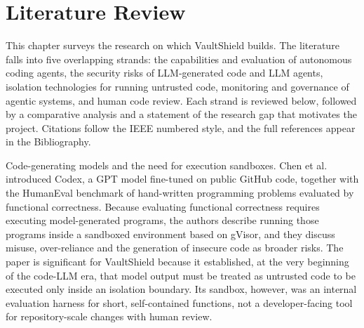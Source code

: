 \documentclass[12pt,a4paper,oneside]{report}
\begin{document}
\clearpage

\chapter{Literature Review}\label{literature-review}

This chapter surveys the research on which VaultShield builds. The literature falls into five overlapping strands: the capabilities and evaluation of autonomous coding agents, the security risks of LLM-generated code and LLM agents, isolation technologies for running untrusted code, monitoring and governance of agentic systems, and human code review. Each strand is reviewed below, followed by a comparative analysis and a statement of the research gap that motivates the project. Citations follow the IEEE numbered style, and the full references appear in the Bibliography.

Code-generating models and the need for execution sandboxes. Chen et al.~\cite{ref1} introduced Codex, a GPT model fine-tuned on public GitHub code, together with the HumanEval benchmark of hand-written programming problems evaluated by functional correctness. Because evaluating functional correctness requires executing model-generated programs, the authors describe running those programs inside a sandboxed environment based on gVisor, and they discuss misuse, over-reliance and the generation of insecure code as broader risks. The paper is significant for VaultShield because it established, at the very beginning of the code-LLM era, that model output must be treated as untrusted code to be executed only inside an isolation boundary. Its sandbox, however, was an internal evaluation harness for short, self-contained functions, not a developer-facing tool for repository-scale changes with human review.
\end{document}
